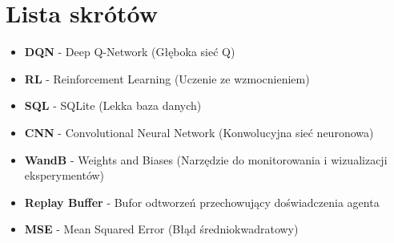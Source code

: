\chapter*{Lista skrótów}

\begin{itemize}[noitemsep,topsep=0pt,parsep=0pt,partopsep=0pt,labelwidth=1cm,align=left,itemindent=0pt]
	\item \textbf{DQN} - Deep Q-Network (Głęboka sieć Q)
	\item \textbf{RL} - Reinforcement Learning (Uczenie ze wzmocnieniem)
	\item \textbf{SQL} - SQLite (Lekka baza danych)
	\item \textbf{CNN} - Convolutional Neural Network (Konwolucyjna sieć neuronowa)
	\item \textbf{WandB} - Weights and Biases (Narzędzie do monitorowania i wizualizacji eksperymentów)
	\item \textbf{Replay Buffer} - Bufor odtworzeń przechowujący doświadczenia agenta
	\item \textbf{MSE} - Mean Squared Error (Błąd średniokwadratowy)
\end{itemize}

